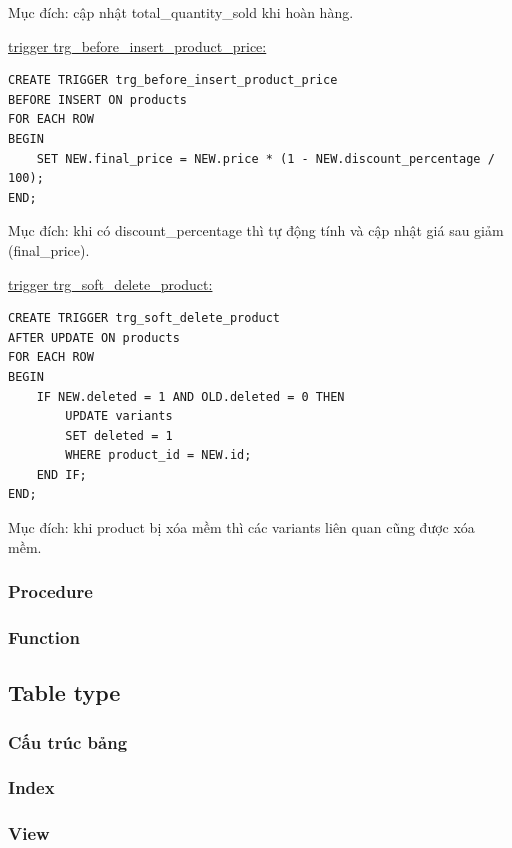 Mục đích: cập nhật total\_quantity\_sold khi hoàn hàng.

\underline{trigger trg\_before\_insert\_product\_price:}

\begin{verbatim}
CREATE TRIGGER trg_before_insert_product_price
BEFORE INSERT ON products
FOR EACH ROW
BEGIN
    SET NEW.final_price = NEW.price * (1 - NEW.discount_percentage / 100);
END;
\end{verbatim}

Mục đích: khi có discount\_percentage thì tự động tính và cập nhật giá sau giảm (final\_price).

\underline{trigger trg\_soft\_delete\_product:}

\begin{verbatim}
CREATE TRIGGER trg_soft_delete_product
AFTER UPDATE ON products
FOR EACH ROW
BEGIN
    IF NEW.deleted = 1 AND OLD.deleted = 0 THEN
        UPDATE variants
        SET deleted = 1
        WHERE product_id = NEW.id;
    END IF;
END;
\end{verbatim}

Mục đích: khi product bị xóa mềm thì các variants liên quan cũng được xóa mềm.

\subsubsection{Procedure}

\subsubsection{Function}

\subsection{Table type}

\subsubsection{Cấu trúc bảng}

\subsubsection{Index}

\subsubsection{View}

